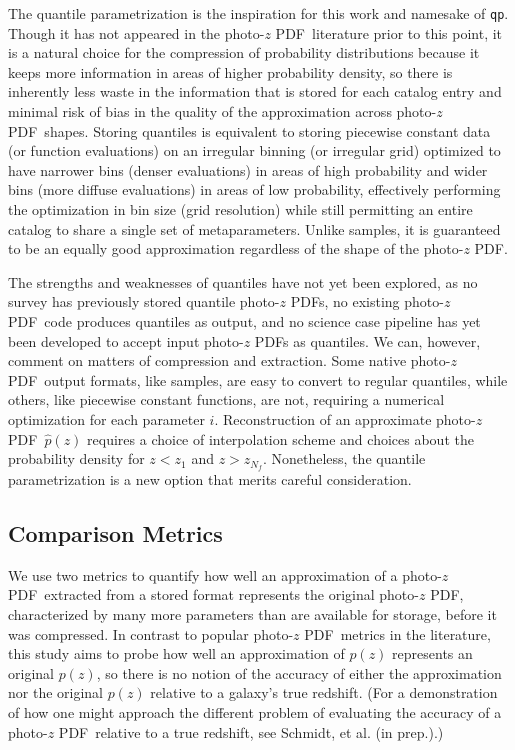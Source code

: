 \documentclass[\docopts]{\docclass}
\newcommand{\qp}{\texttt{qp}}
\newcommand{\pz}{photo-$z$ PDF}
\begin{document}
The quantile parametrization is the inspiration for this work and namesake of 
\qp.  Though it has not appeared in the \pz\ literature prior to this point, it 
is a natural choice for the compression of probability distributions because it 
keeps more information in areas of higher probability density, so there is 
inherently less waste in the information that is stored for each catalog entry 
and minimal risk of bias in the quality of the approximation across \pz\ 
shapes.  Storing quantiles is equivalent to storing piecewise constant data (or 
function evaluations) on an irregular binning (or irregular grid) optimized to 
have narrower bins (denser evaluations) in areas of high probability and wider 
bins (more diffuse evaluations) in areas of low probability, effectively 
performing the optimization in bin size (grid resolution) while still 
permitting an entire catalog to share a single set of metaparameters.  Unlike 
samples, it is guaranteed to be an equally good approximation regardless of the 
shape of the \pz.

The strengths and weaknesses of quantiles have not yet been explored, as no 
survey has previously stored quantile \pz s, no existing \pz\ code produces 
quantiles as output, and no science case pipeline has yet been developed to 
accept input \pz s as quantiles.  We can, however, comment on matters of 
compression and extraction.  Some native \pz\ output formats, like samples, are 
easy to convert to regular quantiles, while others, like piecewise constant 
functions, are not, requiring a numerical optimization for each parameter $i$.  
Reconstruction of an approximate \pz\ $\hat{p}(z)$ requires a choice of 
interpolation scheme and choices about the probability density for $z<z_{1}$ 
and $z>z_{N_{f}}$.  Nonetheless, the quantile parametrization is a new option 
that merits careful consideration.

\subsection{Comparison Metrics}
\label{sec:metrics}

We use two metrics to quantify how well an approximation of a \pz\ extracted 
from a stored format represents the original \pz, characterized by many more 
parameters than are available for storage, before it was compressed.  In 
contrast to popular \pz\ metrics in the literature, this study aims to probe 
how well an approximation of $p(z)$ represents an original $p(z)$, so there is 
no notion of the accuracy of either the approximation nor the original $p(z)$ 
relative to a galaxy's true redshift.  (For a demonstration of how one might 
approach the different problem of evaluating the accuracy of a \pz\ relative to 
a true redshift, see Schmidt, et al. (in prep.).)
\end{document}
